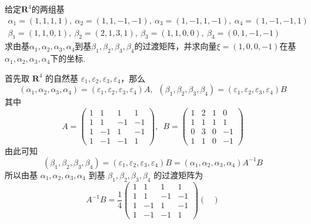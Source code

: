 \begin{exercise}
\begin{exgroup}
        \item 给定$\mathbf{R}^4$的两组基
        \begin{gather*}
            \alpha_1=(1,1,1,1),\ \alpha_2=(1,1,-1,-1),\ \alpha_3=(1,-1,1,-1),\ \alpha_4=(1,-1,-1,1) \\
            \beta_1=(1,1,0,1),\ \beta_2=(2,1,3,1),\ \beta_3=(1,1,0,0),\ \beta_4=(0,1,-1,-1)
        \end{gather*}
        求由基$\alpha_1,\alpha_2,\alpha_3,\alpha_4$到基$\beta_1,\beta_2,\beta_3,\beta_4$的过渡矩阵，并求向量$\xi=(1,0,0,-1)$在基$\alpha_1,\alpha_2,\alpha_3,\alpha_4$下的坐标.
        \begin{answer}
            首先取 $ \mathbf{R}^4 $ 的自然基 $\varepsilon_1, \varepsilon_2, \varepsilon_3, \varepsilon_4$，那么
            \[ (\alpha_1, \alpha_2, \alpha_3, \alpha_4) = (\varepsilon_1, \varepsilon_2, \varepsilon_3, \varepsilon_4) A,\enspace (\beta_1, \beta_2, \beta_3, \beta_4) = (\varepsilon_1, \varepsilon_2, \varepsilon_3, \varepsilon_4) B \]
            其中
            \[ A = \begin{pmatrix}
                    1 & 1  & 1  & 1  \\
                    1 & 1  & -1 & -1 \\
                    1 & -1 & 1  & -1 \\
                    1 & -1 & -1 & 1
                \end{pmatrix},\enspace B = \begin{pmatrix}
                    1 & 2 & 1 & 0  \\
                    1 & 1 & 1 & 1  \\
                    0 & 3 & 0 & -1 \\
                    1 & 1 & 0 & -1
                \end{pmatrix} \]
            由此可知
            \[ (\beta_1, \beta_2, \beta_3, \beta_4) = (\varepsilon_1, \varepsilon_2, \varepsilon_3, \varepsilon_4) B = (\alpha_1, \alpha_2, \alpha_3, \alpha_4) A^{-1} B \]
            所以由基 $ \alpha_1, \alpha_2, \alpha_3, \alpha_4 $ 到基 $ \beta_1, \beta_2, \beta_3, \beta_4 $ 的过渡矩阵为
            \[ A^{-1} B = \dfrac{1}{4} \begin{pmatrix}
                    1 & 1  & 1  & 1  \\
                    1 & 1  & -1 & -1 \\
                    1 & -1 & 1  & -1 \\
                    1 & -1 & -1 & 1
                \end{pmatrix} \begin{pmatrix}

\end{pmatrix}\]
\end{answer}
\end{exgroup}
\end{exercise}
